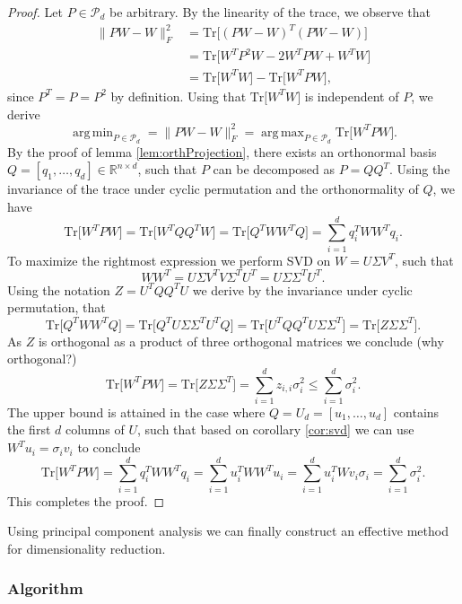 \documentclass[11pt, a4paper]{article}
\newcommand{\R}{\mathds{R}}
\renewcommand{\P}{\mathcal{P}}
\DeclareMathOperator*{\argmin}{arg\,min}
\DeclareMathOperator*{\argmax}{arg\,max}
\begin{document}
\begin{proof}
Let $P \in \P_d$ be arbitrary. By the linearity of the trace, we observe that
\[ \begin{split}
\big \| PW - W \big \|_F^2 
&= \text{Tr} \big [ (PW-W)^T(PW-W) \big ] \\\
&= \text{Tr} \big [ W^T P^2 W - 2 W^TPW + W^TW \big ] \\\
&= \text{Tr} \big [ W^TW\big ] - \text{Tr} \big [W^TPW \big ],
\end{split} \]
since $P^T=P=P^2$ by definition. Using that $\text{Tr} \big [ W^TW\big ]$ is independent of $P$, we derive
\[ \argmin_{P \in \P_d} = \big \| PW-W \big \|_F^2 = \argmax_{P \in \P_d} \text{Tr} \big [ W^TPW\big ]. \]
By the proof of lemma \ref{lem:orthProjection}, there exists an orthonormal basis $Q = [q_1, \dots, q_d] \in \R^{n \times d}$, such that $P$ can be decomposed as $P=QQ^T$. Using the invariance of the trace under cyclic permutation and the orthonormality of $Q$, we have
\[ \text{Tr} \big [ W^TPW \big ] = \text{Tr} \big [ W^TQQ^TW \big ] = \text{Tr} \big [ Q^TWW^TQ \big ] = \sum_{i=1}^{d} q_i^TWW^Tq_i. \]
To maximize the rightmost expression we perform SVD on $W = U \Sigma V^T$, such that
\[ WW^T = U \Sigma V^T V \Sigma^T U^T = U \Sigma \Sigma^T U^T. \]
Using the notation $Z = U^TQQ^TU$ we derive by the invariance under cyclic permutation, that
\[ \text{Tr} \big [ Q^TWW^TQ \big ] = \text{Tr} \big [ Q^TU \Sigma \Sigma^T U^TQ \big ] = \text{Tr} \big [ U^TQQ^TU\Sigma \Sigma^T \big ] = \text{Tr} \big [ Z \Sigma \Sigma^T \big ]. \]
As $Z$ is orthogonal as a product of three orthogonal matrices we conclude (why orthogonal?)
\[  \text{Tr} \big [ W^TPW \big ] = \text{Tr} \big [ Z \Sigma \Sigma^T ] = \sum_{i=1}^{d} z_{i,i} \sigma_i^2 \leq \sum_{i=1}^{d} \sigma_i^2. \]
The upper bound is attained in the case where $Q = U_d = [u_1, \dots, u_d]$ contains the first $d$ columns of $U$, such that based on corollary \ref{cor:svd} we can use $W^Tu_i = \sigma_iv_i$ to conclude
\[ \text{Tr} \big [ W^TPW \big ] = \sum_{i=1}^{d} q_i^TWW^Tq_i = \sum_{i=1}^{d} u_i^TWW^Tu_i = \sum_{i=1}^{d} u_i^TW v_i \sigma_i = \sum_{i=1}^{d} \sigma_i^2. \]
This completes the proof.
\end{proof}

Using principal component analysis we can finally construct an effective method for dimensionality reduction.

\subsubsection{Algorithm}
\end{document}
